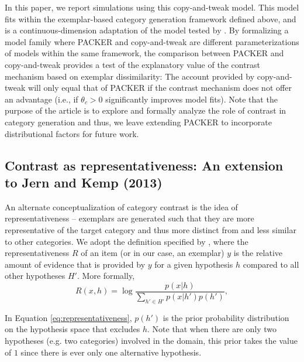 \documentclass[12pt]{article}
\begin{document}
\begin{flushleft}
In this paper, we report simulations using this copy-and-tweak model. This model
fits within the exemplar-based category generation framework defined above, and
is a continuous-dimension adaptation of the model tested by
\cite{jern2013probabilistic}. By formalizing a model family where PACKER and
copy-and-tweak are different parameterizations of models within the same
framework, the comparison between PACKER and copy-and-tweak provides a test of
the explanatory value of the contrast mechanism based on exemplar dissimilarity:
The account provided by copy-and-tweak will only equal that of PACKER if the
contrast mechanism does not offer an advantage (i.e., if $\theta_c > 0$
significantly improves model fits). Note that the purpose of the article is to
explore and formally analyze the role of contrast in category generation and
thus, we leave extending PACKER to incorporate distributional factors \citep[as
explored by][]{jern2013probabilistic} for future work.

\subsection{Contrast as representativeness: An extension to Jern and Kemp
(2013)}
\label{section:representativeness-definition}

An alternate conceptualization of category contrast is the idea of
representativeness -- exemplars are generated such that they are more
representative of the target category and thus more distinct from and less
similar to other categories. We adopt the definition specified by
\cite{tenenbaum01}, where the representativeness $R$ of an item (or in our case,
an exemplar) $y$ is the relative amount of evidence that is provided by $y$ for
a given hypothesis $h$ compared to all other hypotheses $H'$. More formally,
\begin{equation}
  R(x,h) = \log \dfrac{p(x|h)}{\sum_{h'\in H'}{p(x|h')p(h')}} , 
\label{eq:representativeness}
\end{equation}

In Equation \ref{eq:representativeness}, $p(h')$ is the prior probability
distribution on the hypothesis space that excludes $h$. Note that when there are
only two hypotheses (e.g. two categories) involved in the domain, this prior
takes the value of $1$ since there is ever only one alternative hypothesis. 


\end{flushleft}
\end{document}
